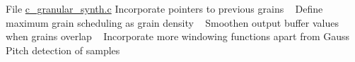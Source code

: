 
\begin{DoxyRefList}
\item[File \mbox{\hyperlink{c__granular__synth_8c}{c\+\_\+granular\+\_\+synth.c}} ]\label{todo__todo000001}%
%
Incorporate pointers to previous grains ~\newline
 Define maximum grain scheduling as grain density ~\newline
 Smoothen output buffer values when grains overlap ~\newline
 Incorporate more windowing functions apart from Gauss ~\newline
 Pitch detection of samples ~\newline
 
\end{DoxyRefList}